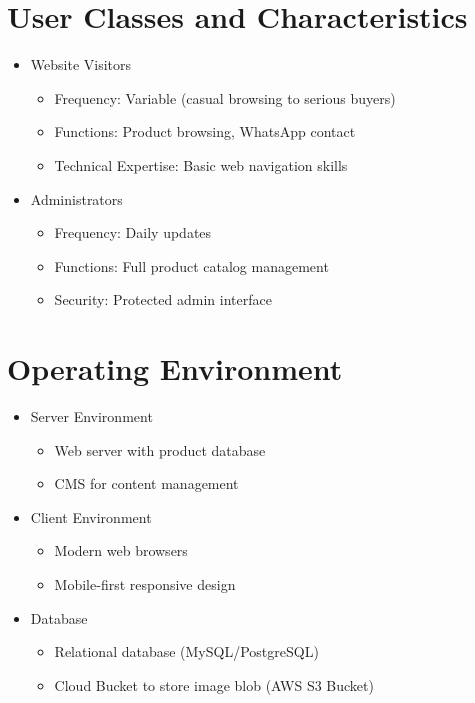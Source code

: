 \documentclass[oneside,a4paper,12pt,explicit]{book}
\begin{document}
\section{User Classes and Characteristics}
\begin{itemize}
    \item Website Visitors
    \begin{itemize}
        \item Frequency: Variable (casual browsing to serious buyers)
        \item Functions: Product browsing, WhatsApp contact
        \item Technical Expertise: Basic web navigation skills
    \end{itemize}
    
    \item Administrators
    \begin{itemize}
        \item Frequency: Daily updates
        \item Functions: Full product catalog management
        \item Security: Protected admin interface
    \end{itemize}
\end{itemize}

\section{Operating Environment}
\begin{itemize}
    \item Server Environment
    \begin{itemize}
        \item Web server with product database
        \item CMS for content management
    \end{itemize}
    
    \item Client Environment
    \begin{itemize}
        \item Modern web browsers
        \item Mobile-first responsive design
    \end{itemize}
    
    \item Database
    \begin{itemize}
        \item Relational database (MySQL/PostgreSQL)
        \item Cloud Bucket to store image blob (AWS S3 Bucket)
    \end{itemize}
\end{itemize}
\end{document}
